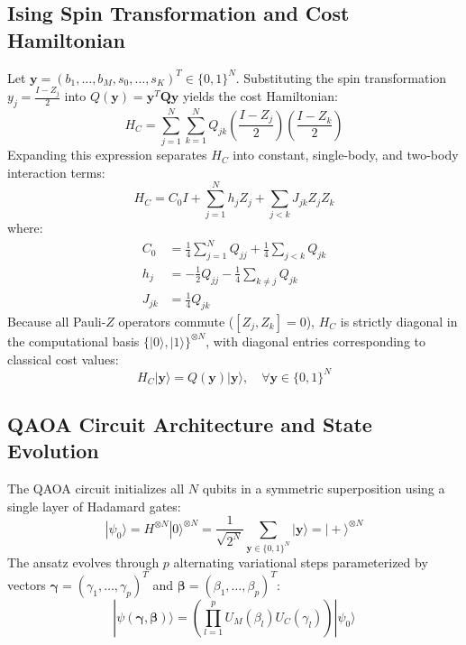 \documentclass[11pt,a4paper]{article}
\theoremstyle{definition}
\theoremstyle{remark}
\begin{document}
\subsection{Ising Spin Transformation and Cost Hamiltonian}
Let $\mathbf{y} = (b_1, \dots, b_M, s_0, \dots, s_K)^T \in \{0, 1\}^N$. Substituting the spin transformation $y_j = \frac{I - Z_j}{2}$ into $Q(\mathbf{y}) = \mathbf{y}^T \mathbf{Q} \mathbf{y}$ yields the cost Hamiltonian:
\begin{equation}
H_C = \sum_{j=1}^N \sum_{k=1}^N Q_{jk} \left( \frac{I - Z_j}{2} \right) \left( \frac{I - Z_k}{2} \right)
\end{equation}
Expanding this expression separates $H_C$ into constant, single-body, and two-body interaction terms:
\begin{equation}
H_C = C_0 I + \sum_{j=1}^N h_j Z_j + \sum_{j < k} J_{jk} Z_j Z_k
\label{eq:cost_hamiltonian}
\end{equation}
where:
\begin{align}
C_0 &= \frac{1}{4} \sum_{j=1}^N Q_{jj} + \frac{1}{4} \sum_{j < k} Q_{jk} \\
h_j &= -\frac{1}{2} Q_{jj} - \frac{1}{4} \sum_{k \ne j} Q_{jk} \\
J_{jk} &= \frac{1}{4} Q_{jk}
\end{align}
Because all Pauli-$Z$ operators commute ($[Z_j, Z_k] = 0$), $H_C$ is strictly diagonal in the computational basis $\{|0\rangle, |1\rangle\}^{\otimes N}$, with diagonal entries corresponding to classical cost values:
\begin{equation}
H_C |\mathbf{y}\rangle = Q(\mathbf{y}) |\mathbf{y}\rangle, \quad \forall \mathbf{y} \in \{0, 1\}^N
\end{equation}

\subsection{QAOA Circuit Architecture and State Evolution}
The QAOA circuit initializes all $N$ qubits in a symmetric superposition using a single layer of Hadamard gates:
\begin{equation}
|\psi_0\rangle = H^{\otimes N} |0\rangle^{\otimes N} = \frac{1}{\sqrt{2^N}} \sum_{\mathbf{y} \in \{0, 1\}^N} |\mathbf{y}\rangle = |+\rangle^{\otimes N}
\end{equation}
The ansatz evolves through $p$ alternating variational steps parameterized by vectors $\boldsymbol{\gamma} = (\gamma_1, \dots, \gamma_p)^T$ and $\boldsymbol{\beta} = (\beta_1, \dots, \beta_p)^T$:
\begin{equation}
|\psi(\boldsymbol{\gamma}, \boldsymbol{\beta})\rangle = \left( \prod_{l=1}^p U_M(\beta_l) U_C(\gamma_l) \right) |\psi_0\rangle
\end{equation}
\end{document}
